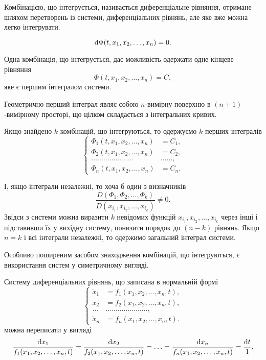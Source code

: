 \begin{definition}
	Комбінацією, що інтегрується, називається диференціальне рівняння, отримане шляхом перетворень із системи, диференціальних рівнянь, але яке вже можна легко інтегрувати.
\end{definition}
\begin{equation*}
	\mathop{}\!\mathrm{d} \Phi(t, x_1, x_2, \ldots, x_n) = 0.
\end{equation*}

Одна комбінація, що інтегрується, дає можливість одержати одне кінцеве рівняння
\begin{equation*}
	\Phi(t, x_1, x_2, \ldots, x_n) = C,
\end{equation*}
яке є першим інтегралом системи. \parvskip

Геометрично перший інтеграл являє собою $n$-вимірну поверхню в $(n + 1)$-вимірному просторі, що цілком складається з інтегральних кривих. \parvskip

Якщо знайдено $k$ комбінацій, що інтегруються, то одержуємо $k$ перших інтегралів
\begin{equation*}
	\left\{
		\begin{aligned}
			\Phi_1(t, x_1, x_2, \ldots, x_n) &= C_1, \\
			\Phi_2(t, x_1, x_2, \ldots, x_n) &= C_2, \\
			\ldots \ldots \ldots \ldots \ldots \ldots \ldots & \ldots \ldots, \\
			\Phi_n(t, x_1, x_2, \ldots, x_n) &= C_n.
		\end{aligned}
	\right.
\end{equation*}
 
І, якщо інтеграли незалежні, то хоча б один з визначників \[\frac{D(\Phi_1, \Phi_2, \ldots, \Phi_k)}{D(x_{i_1}, x_{i_2}, \ldots, x_{i_k})} \ne 0.\] Звідси з системи можна виразити $k$ невідомих функцій $x_{i_1}, x_{i_2}, \ldots, x_{i_k}$ через інші і підставивши їх у вихідну систему, понизити порядок до $(n - k)$ рівнянь. Якщо $n = k$ і всі інтеграли незалежні, то одержимо загальний інтеграл системи. \parvskip

Особливо поширеним засобом знаходження комбінацій, що інтегруються, є використання систем у симетричному вигляді. \parvskip

Систему диференціальних рівнянь, що записана в нормальній формі
\begin{equation*}
	\left\{
		\begin{aligned}
			\dot x_1 &= f_1 (x_1, x_2, \ldots, x_n, t), \\
			\dot x_2 &= f_2 (x_1, x_2, \ldots, x_n, t), \\
			\ldots & \ldots \ldots \ldots \ldots \ldots \ldots \ldots, \\
			\dot x_n &= f_n (x_1, x_2, \ldots, x_n, t).
		\end{aligned}
	\right.
\end{equation*}
можна переписати у вигляді
\begin{equation*}
	\frac{\mathop{}\!\mathrm{d} x_1}{f_1(x_1, x_2, \ldots, x_n, t)} = \frac{\mathop{}\!\mathrm{d} x_2}{f_2 (x_1, x_2, \ldots, x_n, t)} = \ldots = \frac{\mathop{}\!\mathrm{d} x_n}{f_n (x_1, x_2, \ldots, x_n, t)} = \frac{\mathop{}\!\mathrm{d} t}{1}.
\end{equation*}

